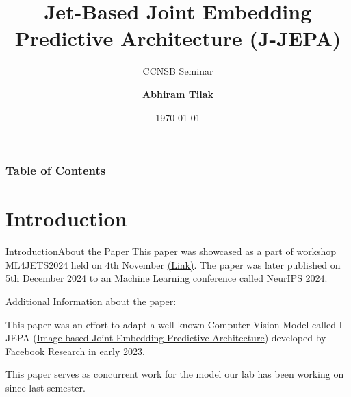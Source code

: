 \documentclass[10pt]{beamer}
\title[J-JEPA]{Jet-Based Joint Embedding Predictive Architecture (J-JEPA)}
\subtitle{CCNSB Seminar}
\author[Abhiram Tilak]
{\textbf{Abhiram Tilak}}
\institute[IIITH]
{
	\textit{\tiny{CND Dual Degree}} \\
	\textit{IIIT Hyderabad}
}
\date{\today}
\let\olditemize\itemize
\let\endolditemize\enditemize
\renewenvironment{itemize}{
  \olditemize[<+->] %
}{\endolditemize}
\begin{document}
\begin{frame}
	\titlepage
\end{frame}

\begin{frame}
\frametitle{Table of Contents}
\tableofcontents
\end{frame}

\section{Introduction}

\begin{frame}{Introduction}{About the Paper}
  This paper was showcased as a part of workshop ML4JETS2024 held on
  4th November \href{https://indico.cern.ch/event/1386125/}{(Link)}.
  The paper was later published on 5th December 2024 to an Machine
  Learning conference called NeurIPS 2024.
  \vspace{2em}

  Additional Information about the paper:
  \begin{itemize}
    \item This paper was an effort to adapt a well known Computer Vision Model
      called I-JEPA (\href{https://arxiv.org/abs/2301.08243}{Image-based Joint-Embedding Predictive Architecture})
      developed by Facebook Research in early 2023.
    \item This paper serves as concurrent work for the model our lab has been working on since last semester.
  \end{itemize}
\end{frame}
\end{document}
